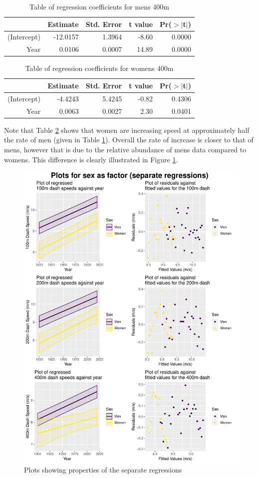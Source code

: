 \documentclass[11pt]{article}
\begin{document}
\begin{table}[ht]
\centering
\begin{tabular}{rrrrr}
  \hline
 & Estimate & Std. Error & t value & Pr($>$$|$t$|$) \\ 
  \hline
(Intercept) & -12.0157 & 1.3964 & -8.60 & 0.0000 \\ 
  Year & 0.0106 & 0.0007 & 14.89 & 0.0000 \\ 
   \hline
\end{tabular}
\caption{Table of regression coefficients for mens 400m}
\label{tab:400m}
\end{table}

\begin{table}[ht]
\centering
\begin{tabular}{rrrrr}
  \hline
 & Estimate & Std. Error & t value & Pr($>$$|$t$|$) \\ 
  \hline
(Intercept) & -4.4243 & 5.4245 & -0.82 & 0.4306 \\ 
  Year & 0.0063 & 0.0027 & 2.30 & 0.0401 \\ 
   \hline
\end{tabular}
\caption{Table of regression coefficients for womens 400m}
\label{tab:400w}
\end{table}

Note that Table \ref{tab:400w} shows that women are increasing speed at approximately half the rate of men (given in Table \ref{tab:400m}). Overall the rate of increase is closer to that of mens, however that is due to the relative abundance of mens data compared to womens. This difference is clearly illustrated in Figure \ref{fig:npplots}.

\begin{figure}
 
  \centering
    \includegraphics[width=\textwidth]{npplots}
 \caption{Plots showing properties of the separate regressions}
\label{fig:npplots}
\end{figure}
\end{document}
